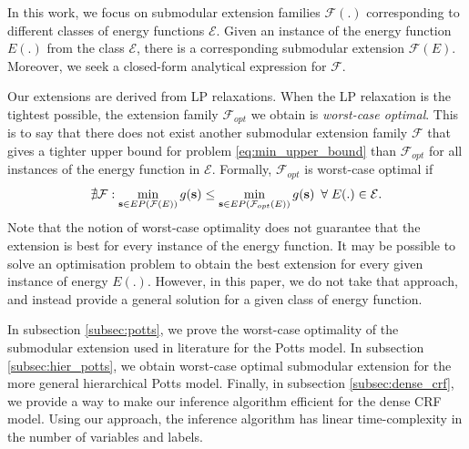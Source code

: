 In this work, we focus on submodular extension families $\mathcal F(.)$
corresponding to different classes of energy functions $\mathcal E$. Given an
instance of the energy function $E(.)$ from the class $\mathcal E$,  there is
a corresponding submodular extension ${\mathcal F}(E)$. Moreover, we seek a closed-form analytical expression for $\mathcal F$. 



Our extensions are derived from LP relaxations. When the LP relaxation is the
tightest possible, the extension family ${\mathcal
F}_{opt}$ we obtain is \emph{worst-case optimal}. This is to say that there does not
exist another submodular extension family ${\mathcal F}$ that gives a tighter
upper bound for problem \eqref{eq:min_upper_bound} than ${\mathcal F}_{opt}$
for all instances of the energy function in $\mathcal E$. Formally, ${\mathcal F}_{opt}$ is worst-case optimal if
\begin{equation}
    \nexists {\mathcal F}: \min_{{\bf s} \in EP({\mathcal F}(E))} g({\bf s})
    \leq \min_{{\bf s} \in EP({\mathcal F}_{opt}(E))} g({\bf s}) \enspace
    \forall \; E(.) \in \mathcal E.
    \label{eq:best_submod}
\end{equation}
Note that the notion of worst-case optimality does not guarantee that the
extension is best for every instance of the energy function. It may be possible
to solve an optimisation problem to obtain the best extension for every given
instance of energy $E(.)$. However, in this paper, we do not take that approach, and instead provide a general solution for a given class of energy function. 

In subsection \ref{subsec:potts}, we prove the worst-case optimality of the submodular extension used in literature for the Potts model. In subsection \ref{subsec:hier_potts}, we obtain worst-case optimal submodular extension for the more general hierarchical Potts model. Finally, in subsection \ref{subsec:dense_crf}, we provide a way to make our inference algorithm efficient for the dense CRF model. Using our approach, the inference algorithm has linear time-complexity in the number of variables and labels.

